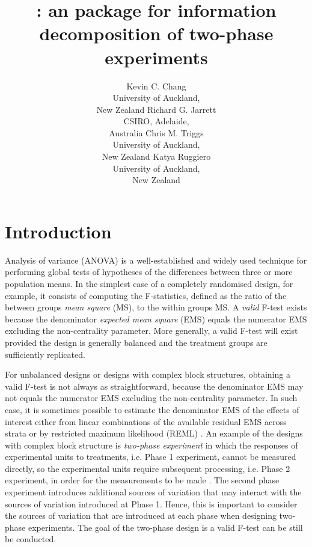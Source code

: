\documentclass[article]{jss}
\author{Kevin C. Chang\\University of Auckland,\\ New Zealand \And
        Richard G. Jarrett\\CSIRO, Adelaide,\\ Australia \And
        Chris M. Triggs\\University of Auckland,\\ New Zealand \And
        Katya Ruggiero\\University of Auckland,\\ New Zealand }
\title{\pkg{InfoDecompuTE}: an \proglang{R} package for information decomposition of two-phase experiments}
\begin{document}
\section[Introduction]{Introduction}
Analysis of variance (ANOVA) is a well-established and widely used technique for performing global tests of hypotheses of the differences between three or more population means. In the simplest case of a completely randomised design, for example, it consists of computing the F-statistics, defined as the ratio of the between groups \emph{mean square} (MS), to the within groups MS. A \emph{valid} F-test exists because the denominator \emph{expected mean square} (EMS) equals the numerator EMS excluding the non-centrality parameter. More generally, a valid F-test will exist provided the design is generally balanced and the treatment groups are sufficiently replicated.

For unbalanced designs or designs with complex block structures, obtaining a valid F-test is not always as straightforward, because the denominator EMS may not equals the numerator EMS excluding the non-centrality parameter. In such case, it is sometimes possible to estimate the denominator EMS of the effects of interest either from linear combinations of the available residual EMS across strata \citep{Satterthwaite1946} or by restricted maximum likelihood (REML) \citep{Patterson1971}. An example of the designs with complex block structure is \emph{two-phase experiment} in which the responses of experimental units to treatments, i.e. Phase 1 experiment, cannot be measured directly, so the experimental units require subsequent processing, i.e. Phase 2 experiment, in order for the measurements to be made \citep{McIntyre1955}. The second phase experiment introduces additional sources of variation that may interact with the sources of variation introduced at Phase 1. Hence, this is important to consider the sources of variation that are introduced at each phase when designing two-phase experiments. The goal of the two-phase design is a valid F-test can be still be conducted. 

\end{document}
